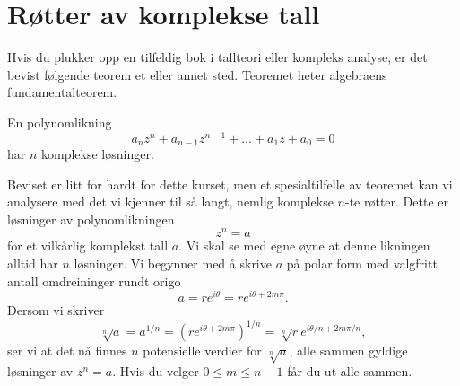 \section*{Røtter av komplekse tall}
Hvis du plukker opp en tilfeldig bok i tallteori eller kompleks analyse, er det bevist følgende teorem et eller annet sted. Teoremet heter algebraens fundamentalteorem.
\begin{thm}
En polynomlikning
\[
a_nz^n+a_{n-1}z^{n-1}+...+a_1z+a_0=0
\]
har $n$ komplekse løsninger.
\end{thm}
Beviset er litt for hardt for dette kurset, men et spesialtilfelle av teoremet kan vi analysere med det vi kjenner til så langt, nemlig komplekse $n$-te røtter.  Dette er løsninger av polynomlikningen
\[
z^n=a
\]
for et vilkårlig komplekst tall $a$. Vi skal se med egne øyne at denne likningen alltid har $n$ løsninger. Vi begynner med å skrive $a$ på polar form med valgfritt antall omdreininger rundt origo
\[
a = re^{i \theta}=re^{i \theta+2m\pi}.
\]
Dersom vi skriver 
\[
\sqrt[n]{a}=a^{1/n} = (re^{i \theta+2m\pi})^{1/n}=\sqrt[n]{r}e^{i \theta/n+2m\pi/n},
\]
ser vi at det nå finnes $n$ potensielle verdier for $\sqrt[n]{a}$, alle sammen gyldige løsninger av $z^n=a$. Hvis du velger $0\leq m \leq n-1$ får du ut alle sammen. 
